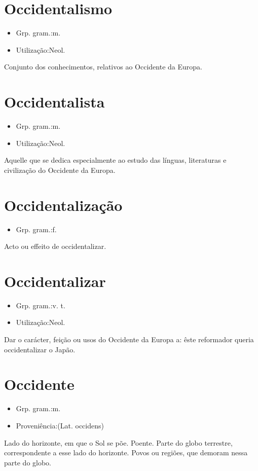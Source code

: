 \section{Occidentalismo}
\begin{itemize}
\item {Grp. gram.:m.}
\end{itemize}
\begin{itemize}
\item {Utilização:Neol.}
\end{itemize}
Conjunto dos conhecimentos, relativos ao Occidente da Europa.
\section{Occidentalista}
\begin{itemize}
\item {Grp. gram.:m.}
\end{itemize}
\begin{itemize}
\item {Utilização:Neol.}
\end{itemize}
Aquelle que se dedica especialmente ao estudo das línguas, literaturas e civilização do Occidente da Europa.
\section{Occidentalização}
\begin{itemize}
\item {Grp. gram.:f.}
\end{itemize}
Acto ou effeito de \textunderscore occidentalizar\textunderscore .
\section{Occidentalizar}
\begin{itemize}
\item {Grp. gram.:v. t.}
\end{itemize}
\begin{itemize}
\item {Utilização:Neol.}
\end{itemize}
Dar o carácter, feição ou usos do Occidente da Europa a: \textunderscore êste reformador queria occidentalizar o Japão\textunderscore .
\section{Occidente}
\begin{itemize}
\item {Grp. gram.:m.}
\end{itemize}
\begin{itemize}
\item {Proveniência:(Lat. \textunderscore occidens\textunderscore )}
\end{itemize}
Lado do horizonte, em que o Sol se põe.
Poente.
Parte do globo terrestre, correspondente a esse lado do horizonte.
Povos ou regiões, que demoram nessa parte do globo.
